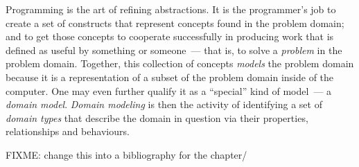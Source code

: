 \documentclass{book}
\begin{document}
Programming is the art of refining abstractions. It is the
programmer's job to create a set of constructs that represent concepts
found in the problem domain; and to get those concepts to cooperate
successfully in producing work that is defined as useful by something
or someone~--- that is, to solve a \emph{problem} in the problem
domain. Together, this collection of concepts \emph{models} the
problem domain because it is a representation of a subset of the
problem domain inside of the computer. One may even further qualify it
as a ``special'' kind of model~--- a \emph{domain model}. \emph{Domain
  modeling} is then the activity of identifying a set of \emph{domain
  types} that describe the domain in question via their properties,
relationships and behaviours.


FIXME: change this into a bibliography for the chapter/

\end{document}
